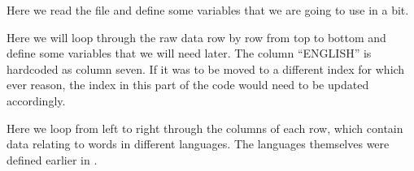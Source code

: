 \documentclass[letterpaper,10pt,english]{sphinxmanual}
\begin{document}
{{{{\begin{sphinxVerbatim}[commandchars=\\\{\}]
  
     
  \PYG{p}{[}\PYG{p}{]}
  
  
  
\end{sphinxVerbatim}

\sphinxAtStartPar
Here we read the file  and define some variables that we are
going to use in a bit.

\begin{sphinxVerbatim}[commandchars=\\\{\}]
    
       \PYG{p}{[}\PYG{p}{]}
      \PYG{p}{[}\PYG{p}{]}\PYG{p}{[}\PYG{p}{]}
      
\end{sphinxVerbatim}

\sphinxAtStartPar
Here we will loop through the raw data  row by row from top to
bottom and define some variables that we will need later. The column “ENGLISH”
is hard\sphinxhyphen{}coded as column seven. If it was to be moved to a different index for
which ever reason, the index in this part of the code would need to be updated
accordingly.

\begin{sphinxVerbatim}[commandchars=\\\{\}]
   
\end{sphinxVerbatim}

\sphinxAtStartPar
Here we loop from left to right through the columns of each row, which contain
data relating to words in different languages. The languages themselves were
defined earlier in .

}}}}
\end{document}
